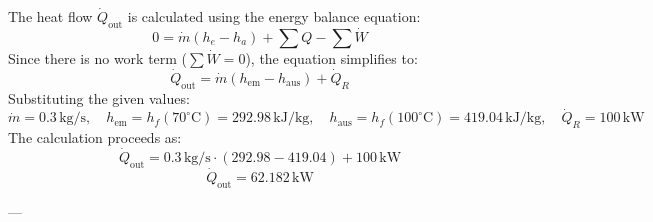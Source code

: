 The heat flow \( \dot{Q}_{\text{out}} \) is calculated using the energy balance equation:  
\[
0 = \dot{m} (h_e - h_a) + \sum Q - \sum \dot{W}
\]  
Since there is no work term (\( \sum \dot{W} = 0 \)), the equation simplifies to:  
\[
\dot{Q}_{\text{out}} = \dot{m} (h_{\text{em}} - h_{\text{aus}}) + \dot{Q}_R
\]  
Substituting the given values:  
\[
\dot{m} = 0.3 \, \text{kg/s}, \quad h_{\text{em}} = h_f(70^\circ\text{C}) = 292.98 \, \text{kJ/kg}, \quad h_{\text{aus}} = h_f(100^\circ\text{C}) = 419.04 \, \text{kJ/kg}, \quad \dot{Q}_R = 100 \, \text{kW}
\]  
The calculation proceeds as:  
\[
\dot{Q}_{\text{out}} = 0.3 \, \text{kg/s} \cdot (292.98 - 419.04) + 100 \, \text{kW}
\]  
\[
\dot{Q}_{\text{out}} = 62.182 \, \text{kW}
\]  

---